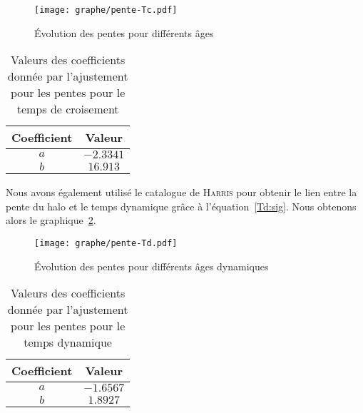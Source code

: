 				\begin{figure}[hbt!]
					\centering \texttt{[image: graphe/pente-Tc.pdf]}
					\caption{Évolution des pentes pour différents âges}
					\label{Pente-lin_dim}
				\end{figure}
				\begin{table}[hbt!]
					\begin{center}
						\begin{tabular}{|c|c|}%
							\hline
							Coefficient & Valeur \\ %
							\hline
							\hline
							$a$       &         $-2.3341$   \\ %
							\hline
							$b$       &         $16.913$   \\  %
							\hline
						\end{tabular}
					\end{center}
					\caption{Valeurs des coefficients donnée par l'ajustement pour les pentes pour le temps de croisement}
					\label{pente-lin-coeff_dim}
				\end{table}

				Nous avons également utilisé le catalogue de \textsc{Harris} pour obtenir le lien entre la pente du halo et le temps dynamique
				grâce à l'équation~\ref{Td:sig}. Nous obtenons alors le graphique~\ref{Pente-Td-lin}.
				\begin{figure}[hbt!]
					\centering \texttt{[image: graphe/pente-Td.pdf]}
					\caption{Évolution des pentes pour différents âges dynamiques}
					\label{Pente-Td-lin}
				\end{figure}
				\begin{table}[hbt!]
					\begin{center}
						\begin{tabular}{|c|c|}%
							\hline
							Coefficient & Valeur \\ %
							\hline
							\hline
							$a$       &        $-1.6567$   \\ %
							\hline
							$b$       &        $1.8927$     \\ %
							\hline
						\end{tabular}
					\end{center}
					\caption{Valeurs des coefficients donnée par l'ajustement pour les pentes pour le temps dynamique}
					\label{pente-Td-lin-coeff}
				\end{table}

